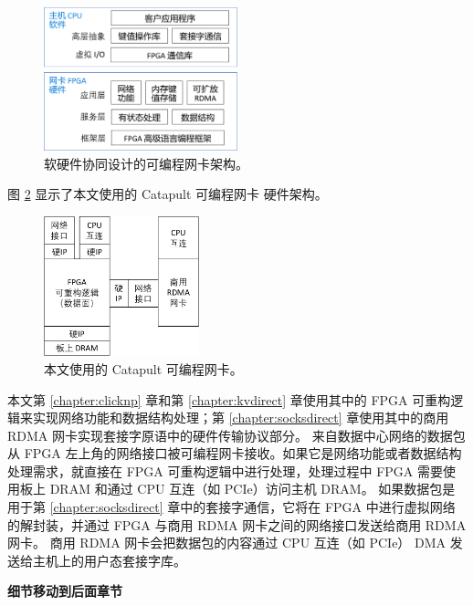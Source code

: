 \begin{figure}[htbp]
	\centering
	\includegraphics[width=0.5\textwidth]{figures/sw_hw_codesign.pdf}
	\caption{软硬件协同设计的可编程网卡架构。}
	\label{arch:fig:sw-hw-codesign}
\end{figure}


图 \ref{arch:fig:my-smartnic-current} 显示了本文使用的 Catapult 可编程网卡 \cite{putnam2014reconfigurable} 硬件架构。


\begin{figure}[htbp]
	\centering
	\includegraphics[width=0.4\textwidth]{figures/smartnic-current.pdf}
	\caption{本文使用的 Catapult 可编程网卡。}
	\label{arch:fig:my-smartnic-current}
\end{figure}




本文第 \ref{chapter:clicknp} 章和第 \ref{chapter:kvdirect} 章使用其中的 FPGA 可重构逻辑来实现网络功能和数据结构处理；第 \ref{chapter:socksdirect} 章使用其中的商用 RDMA 网卡实现套接字原语中的硬件传输协议部分。
来自数据中心网络的数据包从 FPGA 左上角的网络接口被可编程网卡接收。如果它是网络功能或者数据结构处理需求，就直接在 FPGA 可重构逻辑中进行处理，处理过程中 FPGA 需要使用板上 DRAM 和通过 CPU 互连（如 PCIe）访问主机 DRAM。
如果数据包是用于第 \ref{chapter:socksdirect} 章中的套接字通信，它将在 FPGA 中进行虚拟网络的解封装，并通过 FPGA 与商用 RDMA 网卡之间的网络接口发送给商用 RDMA 网卡。
商用 RDMA 网卡会把数据包的内容通过 CPU 互连（如 PCIe） DMA 发送给主机上的用户态套接字库。

\iffalse
\textbf{细节移动到后面章节}


